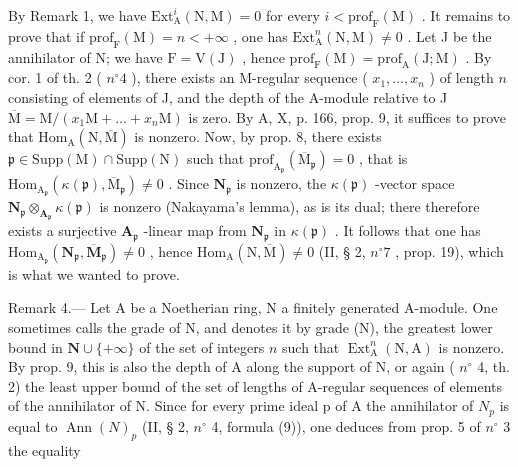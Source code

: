 By Remark 1, we have \(\mathrm{Ext}_{\mathrm{A}}^{i}(\mathrm{N},\mathrm{M}) = 0\) for every \(i < \mathrm{prof}_{\mathrm{F}}(\mathrm{M})\) . It remains to prove that if \(\mathrm{prof}_{\mathrm{F}}(\mathrm{M}) = n < +\infty\) , one has \(\mathrm{Ext}_{\mathrm{A}}^{n}(\mathrm{N},\mathrm{M}) \neq 0\) . Let J be the annihilator of N; we have \(\mathrm{F} = \mathrm{V}(\mathrm{J})\) , hence \(\mathrm{prof}_{\mathrm{F}}(\mathrm{M}) = \mathrm{prof}_{\mathrm{A}}(\mathrm{J};\mathrm{M})\) . By cor. 1 of th. 2 ( \(n^{\circ}4\) ), there exists an M-regular sequence ( \(x_{1},\ldots,x_{n}\) ) of length \(n\) consisting of elements of J, and the depth of the A-module relative to J \(\overline{\mathrm{M}} = \mathrm{M}/(x_{1}\mathrm{M}+\ldots+x_{n}\mathrm{M})\) is zero. By A, X, p. 166, prop. 9, it suffices to prove that \(\mathrm{Hom}_{\mathrm{A}}(\mathrm{N},\overline{\mathrm{M}})\) is nonzero. Now, by prop. 8, there exists \(\mathfrak{p} \in \mathrm{Supp}(\mathrm{M}) \cap \mathrm{Supp}(\mathrm{N})\) such that \(\mathrm{prof}_{\mathrm{A}_{\mathfrak{p}}}(\overline{\mathrm{M}}_{\mathfrak{p}}) = 0\) , that is \(\mathrm{Hom}_{\mathrm{A}_{\mathfrak{p}}}(\kappa(\mathfrak{p}),\overline{\mathrm{M}}_{\mathfrak{p}}) \neq 0\) . Since \(\mathbf{N}_{\mathfrak{p}}\) is nonzero, the \(\kappa(\mathfrak{p})\) -vector space \(\mathbf{N}_{\mathfrak{p}} \otimes_{\mathbf{A}_{\mathfrak{p}}} \kappa(\mathfrak{p})\) is nonzero (Nakayama's lemma), as is its dual; there therefore exists a surjective \(\mathbf{A}_{\mathfrak{p}}\) -linear map from \(\mathbf{N}_{\mathfrak{p}}\) in \(\kappa(\mathfrak{p})\) . It follows that one has \(\mathrm{Hom}_{\mathrm{A}_{\mathfrak{p}}}(\mathbf{N}_{\mathfrak{p}},\overline{\mathbf{M}}_{\mathfrak{p}}) \neq 0\) , hence \(\mathrm{Hom}_{\mathrm{A}}(\mathrm{N},\overline{\mathrm{M}}) \neq 0\) (II, § 2, \(n^{\circ}7\) , prop. 19), which is what we wanted to prove.

Remark 4.--- Let A be a Noetherian ring, N a finitely generated A-module. One sometimes calls the grade of N, and denotes it by grade (N), the greatest lower bound in \(\mathbf{N}\cup\{+\infty\}\) of the set of integers \(n\) such that \(\operatorname{Ext}_{\mathrm{A}}^{n}(\mathrm{N},\mathrm{A})\) is nonzero. By prop. 9, this is also the depth of A along the support of N, or again ( \(n^{\circ}\) 4, th. 2) the least upper bound of the set of lengths of A-regular sequences of elements of the annihilator of N. Since for every prime ideal p of A the annihilator of \(N_{p}\) is equal to \(\operatorname{Ann}(N)_{p}\) (II, § 2, \(n^{\circ}\) 4, formula (9)), one deduces from prop. 5 of \(n^{\circ}\) 3 the equality

